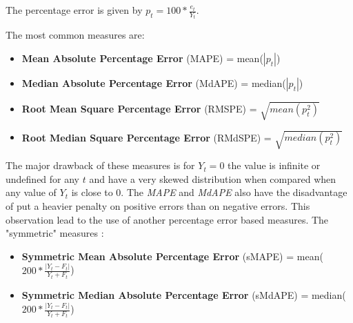The percentage error is given by \begin{math} p_t = 100 * \frac{e_t}{Y_t}
\end{math}.


The most common measures are:
\begin{itemize}
  \item \textbf{Mean Absolute Percentage Error} (MAPE) = mean(\begin{math}
      \left|p_t\right|\end{math})
    \item \textbf{Median Absolute Percentage Error} (MdAPE) = median(\begin{math}
      \left|p_t\right|\end{math})
    \item \textbf{Root Mean Square Percentage Error} (RMSPE) = \begin{math}\sqrt{mean(
      p_t^2)}\end{math}
    \item \textbf{Root Median Square Percentage Error} (RMdSPE) = \begin{math}\sqrt{median(
      p_t^2)}\end{math}
\end{itemize}

The major drawback of these measures is for \begin{math} Y_t = 0 \end{math} the
value is infinite or undefined for any \begin{math} t \end{math} and have a
very skewed distribution when compared when any value of \begin{math} Y_t
\end{math} is close to 0.
The \emph{MAPE} and \emph{MdAPE} also have the disadvantage of put a heavier
penalty on positive errors than on negative errors. This observation lead to the
use of another percentage error based measures. The "symmetric" measures
\cite{RePEc:eee:intfor:v:9:y:1993:i:4:p:527-529}:
\begin{itemize}
  \item \textbf{Symmetric Mean Absolute Percentage Error} (sMAPE) = mean(\begin{math}
      200 * \frac{\left| Y_t - F_t \right|}{Y_t + F_t}\end{math})
    \item \textbf{Symmetric Median Absolute Percentage Error} (sMdAPE) = median(\begin{math}
      200 * \frac{\left| Y_t - F_t \right|}{Y_t + F_t}\end{math})
\end{itemize}

